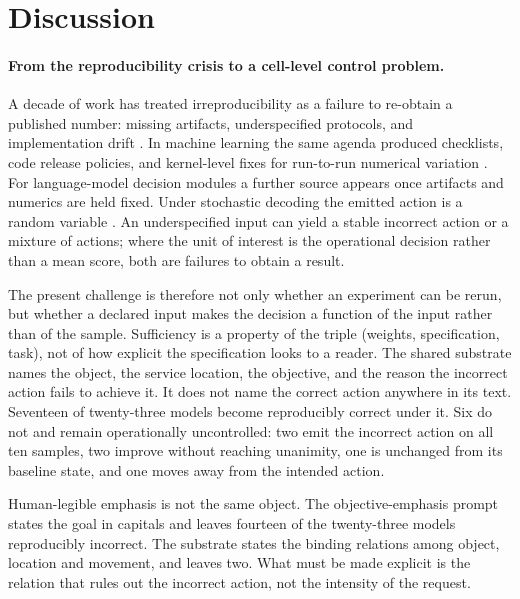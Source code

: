 \section{Discussion}
\label{sec:discussion}

\paragraph{From the reproducibility crisis to a cell-level control problem.}
A decade of work has treated irreproducibility as a failure to re-obtain a published
number: missing artifacts, underspecified protocols, and implementation drift
\citep{baker2016reproducibility,gundersen2018state,pineau2021improving}. In machine
learning the same agenda produced checklists, code release policies, and
kernel-level fixes for run-to-run numerical variation
\citep{pineau2021improving,he2025nondeterminism}. For language-model decision
modules a further source appears once artifacts and numerics are held fixed. Under
stochastic decoding the emitted action is a random variable
\citep{Ouyang_2025,atil2025nondeterminismdeterministicllmsettings}. An
underspecified input can yield a stable incorrect action or a mixture of actions;
where the unit of interest is the operational decision rather than a mean score,
both are failures to obtain a result.

The present challenge is therefore not only whether an experiment can be rerun, but
whether a declared input makes the decision a function of the input rather than of
the sample. Sufficiency is a property of the triple (weights, specification, task),
not of how explicit the specification looks to a reader. The shared substrate
names the object, the service location, the objective, and the reason the incorrect
action fails to achieve it. It does not name the correct action anywhere in its
text. Seventeen of twenty-three models become reproducibly correct under it. Six do
not and remain operationally uncontrolled: two emit the incorrect action on all ten
samples, two improve without reaching unanimity, one is unchanged from its baseline
state, and one moves away from the intended action.

Human-legible emphasis is not the same object. The objective-emphasis prompt states
the goal in capitals and leaves fourteen of the twenty-three models reproducibly
incorrect. The substrate states the binding relations among object, location and
movement, and leaves two. What must be made explicit is the relation that rules out
the incorrect action, not the intensity of the request.

